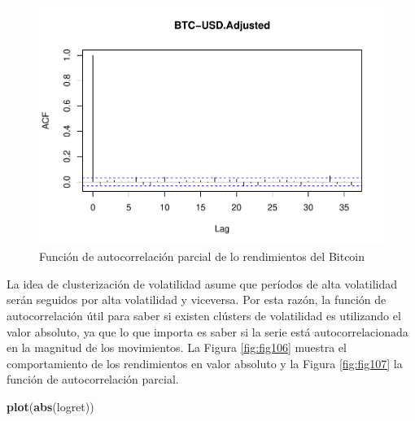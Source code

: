 \documentclass[
]{book}
\newenvironment{Shaded}{\begin{snugshade}}{\end{snugshade}}
\newcommand{\FunctionTok}[1]{\textcolor[rgb]{0.13,0.29,0.53}{\textbf{#1}}}
\newcommand{\NormalTok}[1]{#1}
\begin{document}
\begin{figure}

{\centering \includegraphics{Notas-Series-Tiempo_files/figure-latex/fig105-1} 

}

\caption{Función de autocorrelación parcial de lo rendimientos del Bitcoin}\label{fig:fig105}
\end{figure}

La idea de clusterización de volatilidad asume que períodos de alta volatilidad serán seguidos por alta volatilidad y viceversa. Por esta razón, la función de autocorrelación útil para saber si existen clústers de volatilidad es utilizando el valor absoluto, ya que lo que importa es saber si la serie está autocorrelacionada en la magnitud de los movimientos. La Figura \ref{fig:fig106} muestra el comportamiento de los rendimientos en valor absoluto y la Figura \ref{fig:fig107} la función de autocorrelación parcial.

\begin{Shaded}
\begin{Highlighting}[]
\FunctionTok{plot}\NormalTok{(}\FunctionTok{abs}\NormalTok{(logret))}
\end{Highlighting}
\end{Shaded}
\end{document}
